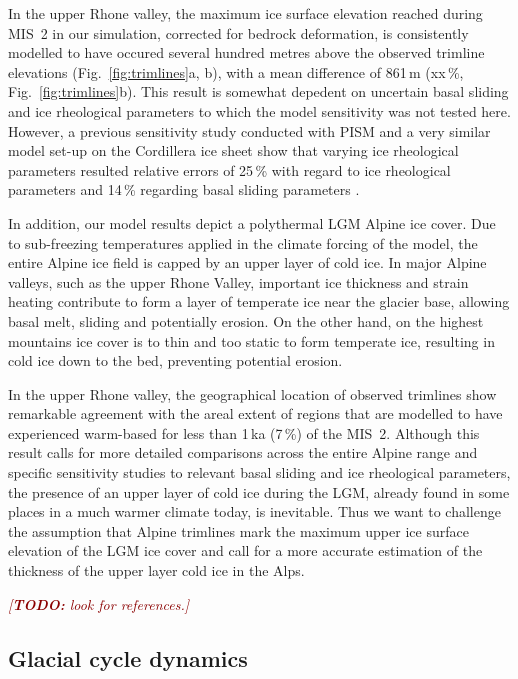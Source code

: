 \documentclass[tc, manuscript]{copernicus}
\newcommand{\todo}[1]{\textcolor{darkred}{\emph{[\textbf{TODO:} #1]}}}
\begin{document}
    In the upper Rhone valley, the maximum ice surface elevation reached
    during MIS~2 in our simulation, corrected for bedrock deformation, is
    consistently modelled to have occured several hundred metres above the
    observed trimline elevations (Fig.~\ref{fig:trimlines}a, b), with a mean
    difference of 861\,m (xx\,\%, Fig.~\ref{fig:trimlines}b). This result is
    somewhat depedent on uncertain basal sliding and ice rheological parameters
    to which the model sensitivity was not tested here. However, a previous
    sensitivity study conducted with PISM and a very similar model set-up on
    the Cordillera ice sheet show that varying ice rheological parameters
    resulted relative errors of 25\,\unit{\%} with regard to ice rheological
    parameters and 14\,\unit{\%} regarding basal sliding parameters
    \citep[Fig.~7]{Seguinot.etal.2016}.

    In addition, our model results depict a polythermal LGM Alpine ice cover.
    Due to sub-freezing temperatures applied in the climate forcing of the
    model, the entire Alpine ice field is capped by an upper layer of cold ice.
    In major Alpine valleys, such as the upper Rhone Valley, important ice
    thickness and strain heating contribute to form a layer of temperate ice
    near the glacier base, allowing basal melt, sliding and potentially
    erosion. On the other hand, on the highest mountains ice cover is to thin
    and too static to form temperate ice, resulting in cold ice down to the
    bed, preventing potential erosion.

    In the upper Rhone valley, the geographical location of observed trimlines
    show remarkable agreement with the areal extent of regions that are
    modelled to have experienced warm-based for less than 1\,ka (7\,\%) of the
    MIS~2. Although this result calls for more detailed comparisons across the
    entire Alpine range and specific sensitivity studies to relevant basal
    sliding and ice rheological parameters, the presence of an upper layer of
    cold ice during the LGM, already found in some places in a much warmer
    climate today, is inevitable. Thus we want to challenge the assumption that
    Alpine trimlines mark the maximum upper ice surface elevation of the LGM
    ice cover and call for a more accurate estimation of the thickness of the
    upper layer cold ice in the Alps.

    \todo{look for references.}


\subsection{Glacial cycle dynamics}
\label{sec:glaciations}
\end{document}
